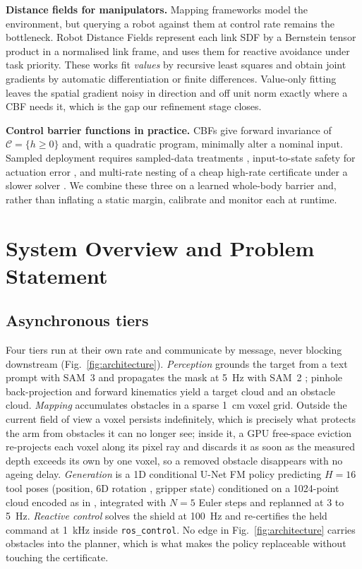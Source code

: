 \documentclass[journal]{IEEEtran}
\begin{document}
\textbf{Distance fields for manipulators.} Mapping frameworks \cite{Oleynikova2017Voxblox} model the environment, but querying a robot against them at control rate remains the bottleneck. Robot Distance Fields \cite{Li2024rdf} represent each link SDF by a Bernstein tensor product in a normalised link frame, and \cite{Govoni2026rdf} uses them for reactive avoidance under task priority. These works fit \emph{values} by recursive least squares and obtain joint gradients by automatic differentiation or finite differences. Value-only fitting leaves the spatial gradient noisy in direction and off unit norm exactly where a CBF needs it, which is the gap our refinement stage closes.

\textbf{Control barrier functions in practice.} CBFs \cite{Ames2019Control} give forward invariance of $\mathcal{C}=\{h\ge 0\}$ and, with a quadratic program, minimally alter a nominal input. Sampled deployment requires sampled-data treatments \cite{Breeden2022Sampled}, input-to-state safety for actuation error \cite{Kolathaya2019Input}, and multi-rate nesting of a cheap high-rate certificate under a slower solver \cite{Rosolia2022Unified}. We combine these three on a learned whole-body barrier and, rather than inflating a static margin, calibrate and monitor each at runtime.

\section{System Overview and Problem Statement}

\subsection{Asynchronous tiers}
Four tiers run at their own rate and communicate by message, never blocking downstream (Fig.~\ref{fig:architecture}). \emph{Perception} grounds the target from a text prompt with SAM~3 \cite{Meta2025Sam3} and propagates the mask at 5~Hz with SAM~2 \cite{Ravi2024Sam2}; pinhole back-projection and forward kinematics yield a target cloud and an obstacle cloud. \emph{Mapping} accumulates obstacles in a sparse 1~cm voxel grid. Outside the current field of view a voxel persists indefinitely, which is precisely what protects the arm from obstacles it can no longer see; inside it, a GPU free-space eviction re-projects each voxel along its pixel ray and discards it as soon as the measured depth exceeds its own by one voxel, so a removed obstacle disappears with no ageing delay. \emph{Generation} is a 1D conditional U-Net \cite{ChiXXXXVisuomotor} FM policy predicting $H=16$ tool poses (position, 6D rotation \cite{Zhou2020Continuity}, gripper state) conditioned on a 1024-point cloud encoded as in \cite{Ze2024Diffusion}, integrated with $N=5$ Euler steps and replanned at 3 to 5~Hz. \emph{Reactive control} solves the shield at 100~Hz and re-certifies the held command at 1~kHz inside \texttt{ros\_control}. No edge in Fig.~\ref{fig:architecture} carries obstacles into the planner, which is what makes the policy replaceable without touching the certificate.
\end{document}
